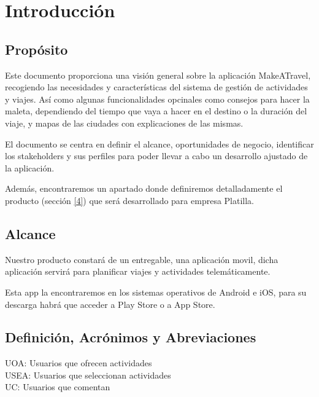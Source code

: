 \documentclass[11pt]{article}
\begin{document}
\tableofcontents
\newpage

\section{Introducción}
\subsection{Propósito}
Este documento proporciona una visión general sobre la aplicación MakeATravel, recogiendo las necesidades y características del sistema de gestión de actividades y viajes. Así como algunas funcionalidades opcinales como consejos para hacer la maleta, dependiendo del tiempo que vaya a hacer en el destino o la duración del viaje, y mapas de las ciudades con explicaciones de las mismas.

El documento se centra en definir el alcance, oportunidades de negocio, identificar los stakeholders y sus perfiles para poder llevar a cabo un desarrollo ajustado de la aplicación.

Además, encontraremos un apartado donde definiremos detalladamente el producto (sección \ref{4}) que será desarrollado para empresa Platilla.


\subsection{Alcance}
Nuestro producto constará de un entregable, una aplicación movil, dicha aplicación servirá para planificar viajes y actividades telemáticamente.

Esta app la encontraremos en los sistemas operativos de Android e iOS, para su descarga habrá que acceder a Play Store o a App Store. 

\subsection{Definición, Acrónimos y Abreviaciones}

UOA: Usuarios que ofrecen actividades\\

USEA: Usuarios que seleccionan actividades\\

UC: Usuarios que comentan\\
\end{document}
